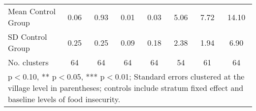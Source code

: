 \begin{table}[htbp]
\begin{tabular}{l*{7}{c}}
Mean Control Group  &        0.06         &        0.93         &        0.01         &        0.03         &        5.06         &        7.72         &       14.10         \\
SD Control Group    &        0.25         &        0.25         &        0.09         &        0.18         &        2.38         &        1.94         &        6.90         \\
No. clusters        &          64         &          64         &          64         &          64         &          54         &          61         &          64         \\
\hline\hline
\multicolumn{8}{l}{\footnotesize * p$<$0.10, ** p$<$0.05, *** p$<$0.01; Standard errors clustered at the village level in parentheses; controls include stratum fixed effect and baseline levels of food insecurity.}\\
\end{tabular}
\end{table}
